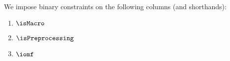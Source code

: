 We impose binary constraints on the following columns (and shorthands):
\begin{multicols}{3}
	\begin{enumerate}
		\item $\isMacro$
		\item $\isPreprocessing$
		\item $\iomf$
	\end{enumerate}
\end{multicols}
